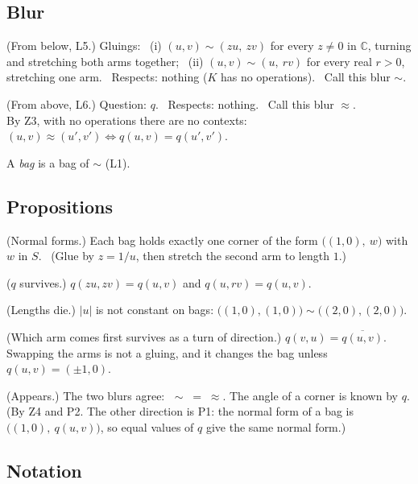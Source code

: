\subsection*{Blur}

\begin{lines}
\item[\lab{B1}] (From below, L5.) Gluings: \ (i) $(u, v) \sim (z u,\ z v)$ for every $z \neq 0$ in $\mathbb{C}$, turning and stretching both arms together; \ (ii) $(u, v) \sim (u,\ r v)$ for every real $r > 0$, stretching one arm. \ Respects: nothing ($K$ has no operations). \ Call this blur $\sim$.
\item[\lab{B2}] (From above, L6.) Question: $q$. \ Respects: nothing. \ Call this blur $\approx$. \\
By Z3, with no operations there are no contexts: \ $(u,v) \approx (u',v') \iff q(u,v) = q(u',v')$.
\item[] A \emph{bag} is a bag of $\sim$ (L1).
\end{lines}

\subsection*{Propositions}

\begin{lines}
\item[\lab{P1}] (Normal forms.) Each bag holds exactly one corner of the form $\bigl((1,0),\ w\bigr)$ with $w$ in $S$. \ (Glue by $z = 1/u$, then stretch the second arm to length $1$.)
\item[\lab{P2}] ($q$ survives.) $q(zu, zv) = q(u, v)$ and $q(u, rv) = q(u, v)$.
\item[\lab{P3}] (Lengths die.) $|u|$ is not constant on bags: $\bigl((1,0),(1,0)\bigr) \sim \bigl((2,0),(2,0)\bigr)$.
\item[\lab{P4}] (Which arm comes first survives as a turn of direction.) $q(v, u) = \overline{q(u, v)}$. Swapping the arms is not a gluing, and it changes the bag unless $q(u,v) = (\pm 1, 0)$.
\item[\lab{P5}] (Appears.) The two blurs agree: $\;\sim \;=\; \approx$. The angle of a corner is known by $q$. \\
(By Z4 and P2. The other direction is P1: the normal form of a bag is $\bigl((1,0),\ q(u,v)\bigr)$, so equal values of $q$ give the same normal form.)
\end{lines}

\subsection*{Notation}


